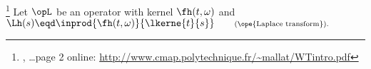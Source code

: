 \begin{theorem}
\footnote{
  ,
  \ldots page 2 online: \url{http://www.cmap.polytechnique.fr/~mallat/WTintro.pdf}
  }
\label{thm:Le=he}
Let $\opL$ be an operator with kernel $\fh(t,\omega)$ and 
\\\indentx$\Lh(s)\eqd \inprod{\fh(t,\omega)}{\lkerne{t}{s}}
   \qquad\scriptstyle
   \text{(\ope{Laplace transform}).}
$\\
\end{theorem}
